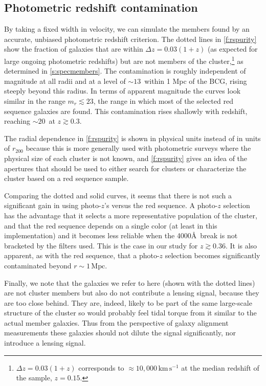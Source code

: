 \subsection{Photometric redshift contamination}

By taking a fixed width in velocity, we can simulate the members found by an accurate, unbiased 
photometric redshift criterion. The dotted lines in \cref{f:rspurity} show the fraction of galaxies 
that are within $\Delta z=0.03(1+z)$ (as expected for large ongoing photometric redshifts) but are 
not members of the cluster,\footnote{$\Delta z=0.03(1+z)$ corresponds to 
$\approx\!10,000\,\mathrm{km\,s^{-1}}$ at the median redshift of the sample, $z=0.15$.} as 
determined in \cref{s:specmembers}. The contamination is roughly independent of magnitude at all 
radii and at a level of $\sim13$\percent\ within 1 Mpc of the BCG, rising steeply beyond this radius. In 
terms of apparent magnitude the curves look similar in the range $m_r\lesssim23$, the range in 
which most of the selected red sequence galaxies are found. This contamination rises shallowly with 
redshift, reaching $\sim\!20$\percent\ at $z\gtrsim0.3$.

The radial dependence in \cref{f:rspurity} is shown in physical units instead of in units of 
$r_{200}$ because this is more generally used with photometric surveys where the physical size of 
each cluster is not known, and \cref{f:rspurity} gives an idea of the apertures that should be used 
to either search for clusters or characterize the cluster based on a red sequence sample.

Comparing the dotted and solid curves, it seems that there is not such a significant gain in using 
photo-$z$'s versus the red sequence. A photo-$z$ selection has the advantage that it selects a more 
representative population of the cluster, and that the red sequence depends on a single color (at 
least in this implementation) and it becomes less reliable when the 4000\AA\ break is not bracketed 
by the filters used. This is the case in our study for $z\gtrsim0.36$. It is also apparent, as with 
the red sequence, that a photo-$z$ selection becomes significantly contaminated beyond 
$r\sim1\,\mathrm{Mpc}$.

Finally, we note that the galaxies we refer to here (shown with the dotted lines) are not cluster 
members but also do not contribute a lensing signal, because they are too close behind. They are, 
indeed, likely to be part of the same large-scale structure of the cluster so would probably feel 
tidal torque from it similar to the actual member galaxies. Thus from the perspective of galaxy 
alignment measurements these galaxies should not dilute the signal significantly, nor introduce a 
lensing signal.

